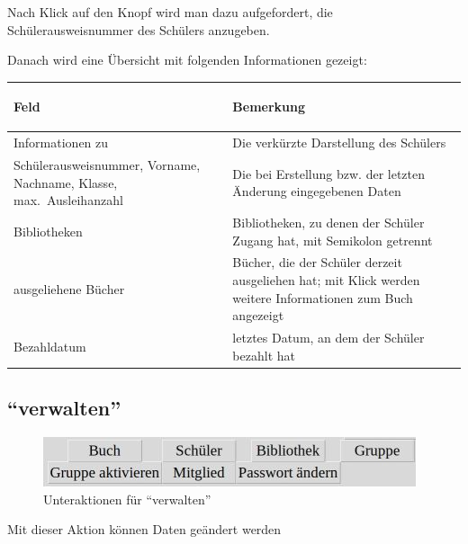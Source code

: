 Nach Klick auf den Knopf wird man dazu aufgefordert, die Schüler\-ausweis\-nummer des Schülers anzugeben.

Danach wird eine Übersicht mit folgenden Informationen gezeigt:

\begin{tabular}{|p{}|p{}|}\hline
\begin{center}Feld\end{center} & \begin{center}Bemerkung\end{center}\\
\hline
Informationen zu & Die verkürzte Darstellung des Schülers\\
\hline
Schülerausweisnummer, Vorname, Nachname, Klasse, max.~Ausleihanzahl & Die bei Erstellung bzw. der letzten Änderung eingegebenen Daten\\
\hline
Bibliotheken & Bibliotheken, zu denen der Schüler Zugang hat, mit Semikolon getrennt\\
\hline
ausgeliehene Bücher & Bücher, die der Schüler derzeit ausgeliehen hat; mit Klick werden weitere Informationen zum Buch angezeigt\\
\hline
Bezahldatum & letztes Datum, an dem der Schüler bezahlt hat\\
\hline
\end{tabular}

\subsection{``verwalten''}
\label{subsec:detail:edit}
\begin{figure}\includegraphics{images/gui2/edit_menu.jpg}\caption{Unteraktionen für ``verwalten''}\label{fig:edit_menu}\end{figure}

Mit dieser Aktion können Daten geändert werden

